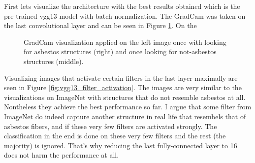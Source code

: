 First lets visualize the architecture with the best results obtained which is the pre-trained vgg13 model with batch normalization. The GradCam was taken on the last convolutional layer and can be seen in Figure \ref{fig:asbestos_gradcam}. On the 

\begin{figure}[H]
\centering
\caption{GradCam visualization applied on the left image once with looking for asbestos structures (right) and once looking for not-asbestos structures (middle).}
\label{fig:asbestos_gradcam}
\end{figure}

Visualizing images that activate certain filters in the last layer maximally are seen in Figure \ref{fig:vgg13_filter_activation}. The images are very similar to the visualizations on ImageNet with structures that do not resemble asbestos at all. Nontheless they achieve the best performance so far. I argue that some filter from ImageNet do indeed capture another structure in real life that resembels that of asbestos fibers, and if these very few filters are activated strongly. The classification in the end is done on these very few filters and the rest (the majority) is ignored. That's why reducing the last fully-connected layer to 16 does not harm the performance at all.

